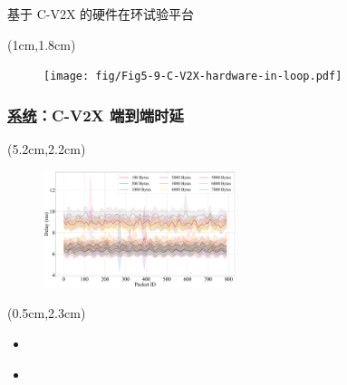 \begin{frame}{基于 C-V2X 的硬件在环试验平台}
\newBackground
\begin{center}
\begin{textblock*}{\textwidth}(1cm,1.8cm)
\begin{figure}
\texttt{[image: fig/Fig5-9-C-V2X-hardware-in-loop.pdf]}
\end{figure}
\end{textblock*}
\end{center}
\end{frame}

\begin{frame}
\frametitle{\englishfont \underline{系统}：C-V2X 端到端时延}
\newBackground
\begin{center}
\begin{textblock*}{\textwidth}(5.2cm,2.2cm)
\begin{figure}
\includegraphics[width=0.5\textwidth]{fig/Fig5-10-delays.pdf}
\end{figure}
\end{textblock*}
\end{center}

\begin{center}
\begin{textblock*}{0.55\textwidth}(0.5cm,2.3cm)
\begin{itemize}[itemsep=0.2\baselineskip] \englishfont 
	\item[\ding{111}] {\color{cqublue}{数据包设置}}
	\begin{itemize}[itemsep=0.2\baselineskip]
	\end{itemize}
	\item[\ding{111}] {\color{cqublue}{时延结果分析}}
	\begin{itemize}[itemsep=0.2\baselineskip]
	\end{itemize}
\end{itemize}
\end{textblock*}
\end{center}

\end{frame}